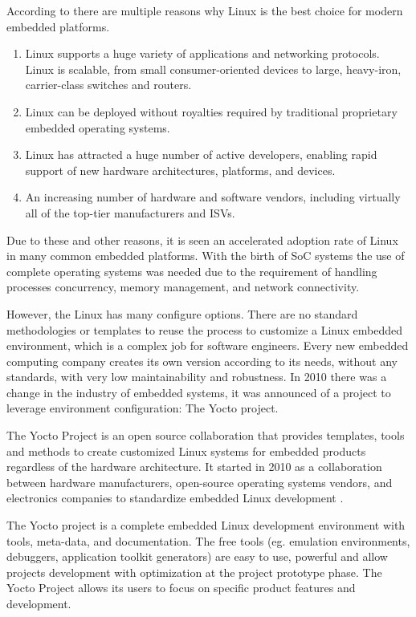According to \cite{Hallinan} there are multiple reasons why Linux is the best
choice for modern embedded platforms.

\begin{enumerate}
\item Linux supports a huge variety of applications and networking protocols.
Linux is scalable, from small consumer-oriented devices to large, heavy-iron,
carrier-class switches and routers.
\item Linux can be deployed without royalties required by traditional proprietary
embedded operating systems.
\item Linux has attracted a huge number of active developers, enabling rapid support
of new hardware architectures, platforms, and devices.
\item An increasing number of hardware and software vendors, including virtually all
of the top-tier manufacturers and ISVs.
\end{enumerate}

Due to these and other reasons, it is seen an accelerated adoption rate of
Linux in many common embedded platforms. With the birth of SoC systems the
use of complete operating systems was needed due to the requirement of handling
processes concurrency, memory management, and network connectivity.

However, the Linux has many configure options. There are no standard
methodologies or templates to reuse the process to customize a Linux
embedded environment, which is a complex job for software engineers.
Every new embedded computing company creates its own version according to its
needs, without any standards, with very low maintainability and robustness. In 2010
there was a change in the industry of embedded systems, it was announced of a
project to leverage environment configuration: The Yocto project.

The Yocto Project is an open source collaboration that provides
templates, tools and methods to create customized Linux systems for
embedded products regardless of the hardware architecture\cite{yocto-project}.
It started in 2010 as a collaboration between hardware manufacturers,
open-source operating systems vendors, and electronics companies to standardize 
embedded Linux development \cite{Leppakoski}.

The Yocto project  is a  complete embedded Linux development environment with
tools, meta-data, and documentation. The free tools (eg. emulation
environments, debuggers, application toolkit generators) are easy to use,
powerful and allow projects development with optimization at the project
prototype phase. The Yocto Project allows its users to focus on
specific product features and development.

